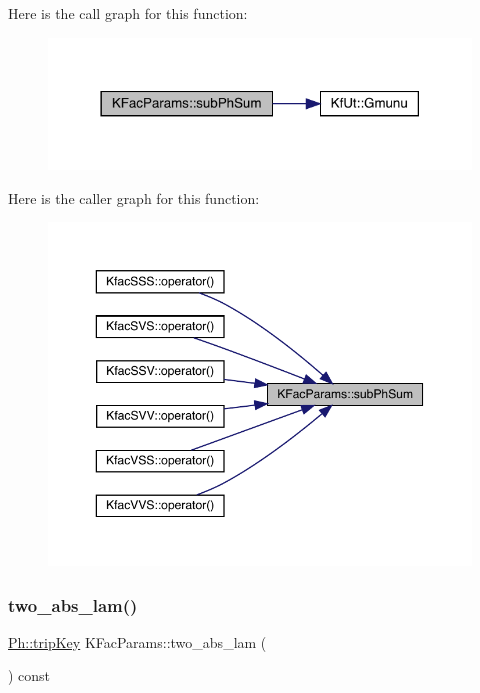 Here is the call graph for this function\+:
\nopagebreak
\begin{figure}[H]
\begin{center}
\leavevmode
\includegraphics[width=318pt]{d7/d41/classKFacParams_ac52a334fdecfea49db82683e194580a1_cgraph}
\end{center}
\end{figure}
Here is the caller graph for this function\+:
\nopagebreak
\begin{figure}[H]
\begin{center}
\leavevmode
\includegraphics[width=350pt]{d7/d41/classKFacParams_ac52a334fdecfea49db82683e194580a1_icgraph}
\end{center}
\end{figure}
\mbox{\label{classKFacParams_a023894ddf4ee41134ce512a2bd2a8075}} 
\subsubsection{\texorpdfstring{two\_abs\_lam()}{two\_abs\_lam()}}
{\footnotesize\ttfamily \mbox{\hyperlink{namespacePh_afdd5bf3d7b37625115089ea3048e0cbb}{Ph\+::trip\+Key}} K\+Fac\+Params\+::two\+\_\+abs\+\_\+lam (\begin{DoxyParamCaption}{ }\end{DoxyParamCaption}) const\hspace{0.3cm}{\ttfamily [virtual]}}




